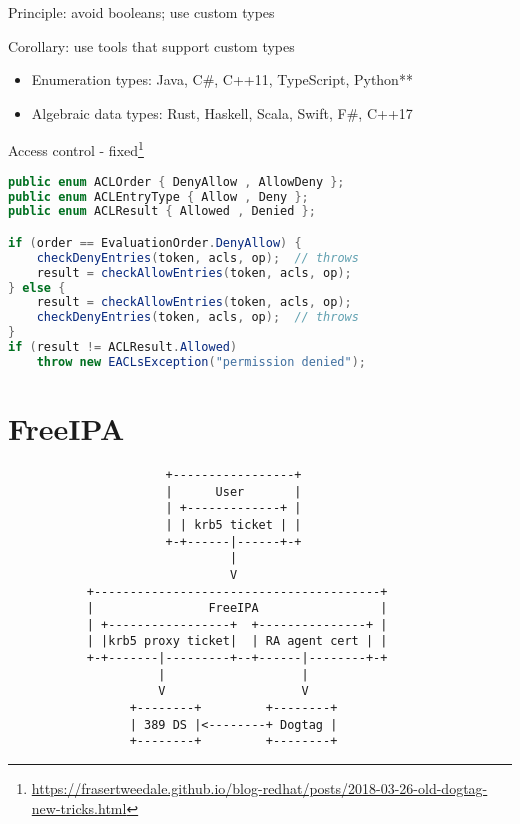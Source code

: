 \documentclass[ignorenonframetext,aspectratio=169,dvipsnames]{beamer}
\begin{document}
\begin{frame}[plain]
\huge Principle: avoid booleans; use custom types
\pause

\Large Corollary: use tools that support custom types
\end{frame}

\begin{frame}[plain]
\Large
\begin{itemize}
    \item Enumeration types: Java, C\#, C++11, TypeScript, Python**
    \item Algebraic data types: Rust, Haskell, Scala, Swift, F\#, C++17
\end{itemize}
\end{frame}


\begin{frame}[fragile]{Access control - fixed\footnote[frame]{
    \url{https://frasertweedale.github.io/blog-redhat/posts/2018-03-26-old-dogtag-new-tricks.html}}}
\begin{lstlisting}[language=Java]
public enum ACLOrder { DenyAllow , AllowDeny };
public enum ACLEntryType { Allow , Deny };
public enum ACLResult { Allowed , Denied };

if (order == EvaluationOrder.DenyAllow) {
    checkDenyEntries(token, acls, op);  // throws
    result = checkAllowEntries(token, acls, op);
} else {
    result = checkAllowEntries(token, acls, op);
    checkDenyEntries(token, acls, op);  // throws
}
if (result != ACLResult.Allowed)
    throw new EACLsException("permission denied");
\end{lstlisting}
\end{frame}




\section{FreeIPA}\label{freeipa}

\begin{frame}
\begin{verbatim}
                      +-----------------+
                      |      User       |
                      | +-------------+ |
                      | | krb5 ticket | |
                      +-+------|------+-+
                               |
                               V
           +----------------------------------------+
           |                FreeIPA                 |
           | +-----------------+  +---------------+ |
           | |krb5 proxy ticket|  | RA agent cert | |
           +-+-------|---------+--+------|--------+-+
                     |                   |
                     V                   V
                 +--------+         +--------+
                 | 389 DS |<--------+ Dogtag |
                 +--------+         +--------+
\end{verbatim}
\end{frame}
\end{document}
